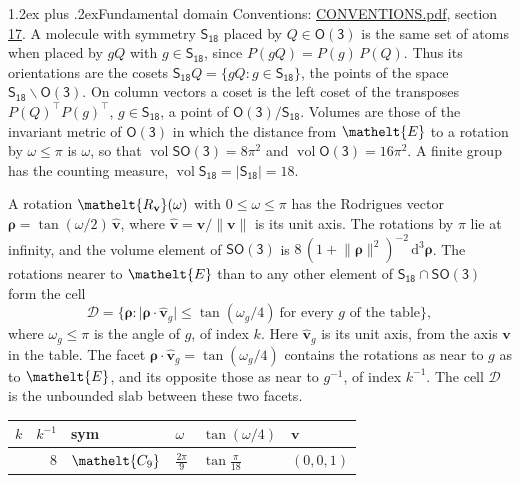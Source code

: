 \documentclass[10pt,a4paper]{article}
\makeatletter
\renewcommand\section{\@startsection{section}{1}{\z@}{-3ex plus -1ex minus -.2ex}%
  {1.2ex plus .2ex}{\normalfont\large\sffamily\bfseries\color{parttitle}}}
\numberwithin{equation}{section}
\newcommand{\eltfont}[1]{{\let\sigma\eltsigma\mathelt{#1}}}
\newcommand{\grp}[1]{\mathsf{#1}}
\newcommand{\cls}[1]{\eltfont{#1}}
\newcommand{\elt}[1]{\eltfont{#1}}
\newcommand{\dirvec}[3]{(#1, #2, #3)}
\newcommand{\unitaxis}{\hat{\mathbf{v}}}
\newcommand{\vv}{\mathbf{v}}
\newcommand{\diff}{\mathrm{d}}
\newcommand{\vol}{\operatorname{vol}}
\newcommand{\rodrigues}{\boldsymbol{\rho}}
\newcommand{\fcell}{\mathcal{D}}
\makeatother
\begin{document}
\section{Fundamental domain}\label{s:fundamental_domain}
Conventions: \href{../../CONVENTIONS.pdf}{CONVENTIONS.pdf}, section \href{../../CONVENTIONS.pdf\#conv.17}{17}.
\leavevmode\label{n:element.placement}A molecule with symmetry $\grp{S_{18}}$ placed by $Q \in \grp{O(3)}$ is the same set of atoms when placed by $gQ$ with $g \in \grp{S_{18}}$, since $P(gQ) = P(g)\,P(Q)$. \label{n:operator.cosets}Thus its orientations are the cosets $\grp{S_{18}}Q = \{gQ : g \in \grp{S_{18}}\}$, the points of the space $\grp{S_{18}}\backslash\grp{O(3)}$. On column vectors a coset is the left coset of the transposes $P(Q)^{\top}P(g)^{\top}$, $g \in \grp{S_{18}}$, a point of $\grp{O(3)}/\grp{S_{18}}$.
\leavevmode\label{n:operator.volume}Volumes are those of the invariant metric of \href{O3.pdf}{$\grp{O(3)}$} in which the distance from $\elt{E}$ to a rotation by $\omega \le \pi$ is $\omega$, so that $\vol\grp{SO(3)} = 8\pi^2$ and $\vol\grp{O(3)} = 16\pi^2$. A finite group has the counting measure, $\vol\grp{S_{18}} = |\grp{S_{18}}| = 18$.

\leavevmode\label{n:vector.rodrigues}\label{n:vector.unitaxis}A rotation $\elt{R_{\vv}}(\omega)$ with $0 \le \omega \le \pi$ has the Rodrigues vector $\rodrigues = \tan(\omega/2)\,\unitaxis$, where $\unitaxis = \vv/\lVert\vv\rVert$ is its unit axis. The rotations by $\pi$ lie at infinity, and the volume element of \href{SO3.pdf}{$\grp{SO(3)}$} is $8\,(1 + \lVert\rodrigues\rVert^2)^{-2}\,\diff^3\rodrigues$.
\leavevmode\label{n:set.cell}The rotations nearer to $\elt{E}$ than to any other element of $\grp{S_{18}} \cap \grp{SO(3)}$ form the cell
\begin{equation}\label{e:cell}\fcell = \bigl\{\rodrigues : \lvert\rodrigues\cdot\unitaxis_g\rvert \le \tan(\omega_g/4)\ \text{for every $g$ of the table}\bigr\},\end{equation}
where $\omega_g \le \pi$ is the angle of $g$, of index $k$. Here $\unitaxis_g$ is its unit axis, from the axis $\vv$ in the table. The facet $\rodrigues\cdot\unitaxis_g = \tan(\omega_g/4)$ contains the rotations as near to $g$ as to $\elt{E}$, and its opposite those as near to $g^{-1}$, of index $k^{-1}$. The cell $\fcell$ is the unbounded slab between these two facets.
{\small{\renewcommand{\arraystretch}{1.3}\begin{longtable}{@{}rrllll@{}}\toprule
$k$ & $k^{-1}$ & sym & $\omega$ & $\tan(\omega/4)$ & $\vv$\\\midrule\endhead
\bottomrule\endfoot\endlastfoot
1 & 8 & $\cls{C_{9}}$ & $\tfrac{2\pi}{9}$ & $\tan\tfrac{\pi}{18}$ & $\dirvec{0}{0}{1}$\\
\bottomrule\end{longtable}}}
\end{document}
